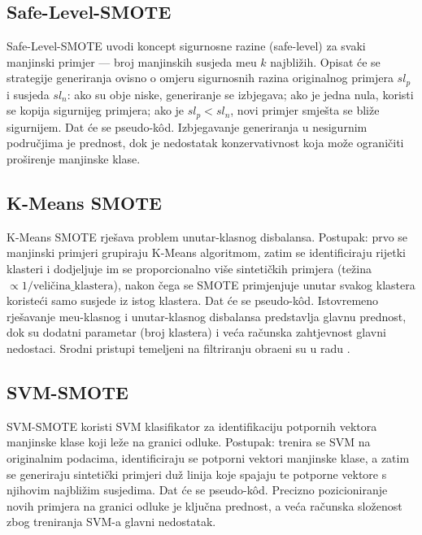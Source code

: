 \subsection{Safe-Level-SMOTE}

Safe-Level-SMOTE \cite{bunkhumpornpat2009} uvodi koncept sigurnosne razine
(safe-level) za svaki manjinski primjer --- broj manjinskih susjeda me\dj{}u
$k$ najbli\v{z}ih. Opisat \'{c}e se strategije generiranja ovisno o omjeru
sigurnosnih razina originalnog primjera $sl_p$ i susjeda $sl_n$: ako su
obje niske, generiranje se izbjegava; ako je jedna nula, koristi se kopija
sigurnijeg primjera; ako je $sl_p < sl_n$, novi primjer smje\v{s}ta se
bli\v{z}e sigurnijem. Dat \'{c}e se pseudo-k\^{o}d. Izbjegavanje
generiranja u nesigurnim podru\v{c}jima je prednost, dok je nedostatak
konzervativnost koja mo\v{z}e ograni\v{c}iti pro\v{s}irenje manjinske
klase.

\subsection{K-Means SMOTE}

K-Means SMOTE \cite{douzas2018} rje\v{s}ava problem unutar-klasnog
disbalansa. Postupak: prvo se manjinski primjeri grupiraju K-Means
algoritmom, zatim se identificiraju rijetki klasteri i dodjeljuje im se
proporcionalno vi\v{s}e sinteti\v{c}kih primjera (te\v{z}ina $\propto
1/\text{veli\v{c}ina\_klastera}$), nakon \v{c}ega se SMOTE primjenjuje
unutar svakog klastera koriste\'{c}i samo susjede iz istog klastera.
Dat \'{c}e se pseudo-k\^{o}d. Istovremeno rje\v{s}avanje me\dj{}u-klasnog
i unutar-klasnog disbalansa predstavlja glavnu prednost, dok su dodatni
parametar (broj klastera) i ve\'{c}a ra\v{c}unska zahtjevnost glavni
nedostaci. Srodni pristupi temeljeni na filtriranju obra\dj{}eni su
u radu \cite{saez2015}.

\subsection{SVM-SMOTE}

SVM-SMOTE \cite{nguyen2011} koristi SVM klasifikator za identifikaciju
potpornih vektora manjinske klase koji le\v{z}e na granici odluke.
Postupak: trenira se SVM na originalnim podacima, identificiraju se
potporni vektori manjinske klase, a zatim se generiraju sinteti\v{c}ki
primjeri du\v{z} linija koje spajaju te potporne vektore s njihovim
najbli\v{z}im susjedima. Dat \'{c}e se pseudo-k\^{o}d. Precizno
pozicioniranje novih primjera na granici odluke je klju\v{c}na prednost,
a ve\'{c}a ra\v{c}unska slo\v{z}enost zbog treniranja SVM-a glavni
nedostatak.

